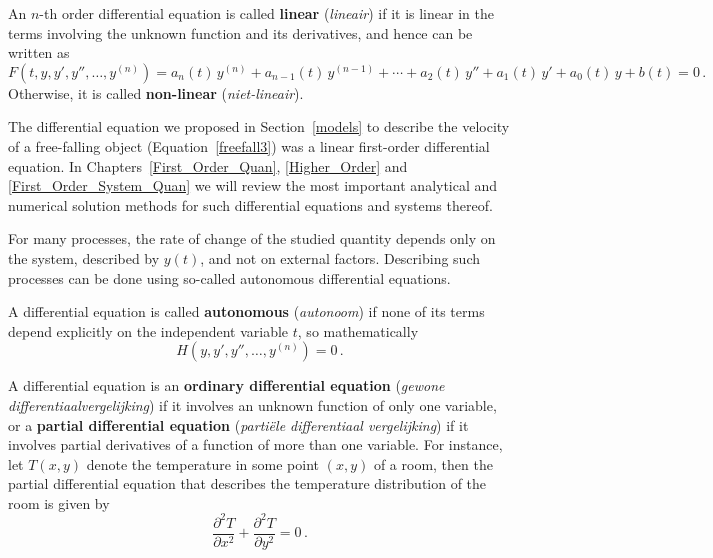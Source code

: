 \begin{definition} 
\label{deflineair}
An $n$-th order differential equation is called \textbf{linear} (\textit{lineair}) if it is linear in the terms involving the unknown function and its derivatives, and hence can be written as
$$
F\left(t,y,y',y'',\ldots,y^{(n)}\right)=a_n(t)\,y^{(n)}+a_{n-1}(t)\,y^{(n-1)}+\cdots+a_2(t)\,y''+a_1(t)\,y'+a_0(t)\,y+b(t)=0\,.
$$
Otherwise, it is called \textbf{non-linear} (\textit{niet-lineair}).
\end{definition}

The differential equation we proposed in Section~\ref{models} to describe the velocity of a free-falling object (Equation~\eqref{freefall3}) was a linear first-order differential equation. In Chapters~\ref{First_Order_Quan}, \ref{Higher_Order} and \ref{First_Order_System_Quan} we will review the most important analytical and numerical solution methods for such differential equations and systems thereof. 

For many processes, the rate of change of the studied quantity depends only on the system, described by $y(t)$, and not on external factors. Describing such processes can be done using so-called autonomous differential equations. 
\begin{definition} 
A differential equation is called \textbf{autonomous} (\textit{autonoom}) if none of its terms depend explicitly on the independent variable $t$, so mathematically
$$
H\left(y,y',y'',\ldots,y^{(n)}\right)=0\,.
$$
\end{definition}


A differential equation is an \textbf{ordinary differential equation} (\textit{gewone differentiaalvergelijking}) if it involves an unknown function of only one variable, or a \textbf{partial differential equation} (\textit{parti\"ele differentiaal vergelijking}) if it involves partial derivatives of a function of more than one variable. For instance, let $T(x,y)$ denote the temperature in some point $(x,y)$ of a room, then the partial differential equation that describes the temperature distribution of the room is given by
$$
\dfrac{\partial^2 T}{\partial x^2}+\dfrac{\partial^2 T}{\partial y^2}=0\,.
$$

